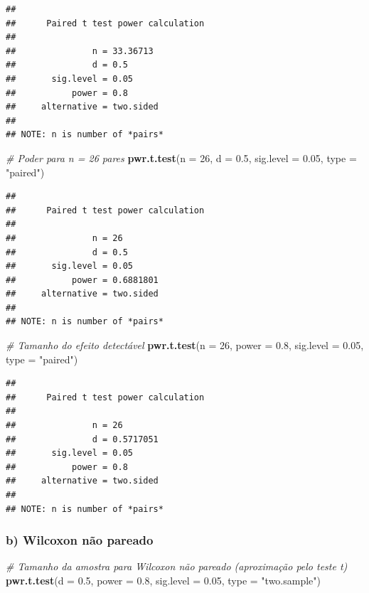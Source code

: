 \documentclass[
]{book}
\newenvironment{Shaded}{\begin{snugshade}}{\end{snugshade}}
\newcommand{\AttributeTok}[1]{\textcolor[rgb]{0.13,0.29,0.53}{#1}}
\newcommand{\CommentTok}[1]{\textcolor[rgb]{0.56,0.35,0.01}{\textit{#1}}}
\newcommand{\DecValTok}[1]{\textcolor[rgb]{0.00,0.00,0.81}{#1}}
\newcommand{\FloatTok}[1]{\textcolor[rgb]{0.00,0.00,0.81}{#1}}
\newcommand{\FunctionTok}[1]{\textcolor[rgb]{0.13,0.29,0.53}{\textbf{#1}}}
\newcommand{\NormalTok}[1]{#1}
\newcommand{\StringTok}[1]{\textcolor[rgb]{0.31,0.60,0.02}{#1}}
\begin{document}
\begin{verbatim}
## 
##      Paired t test power calculation 
## 
##               n = 33.36713
##               d = 0.5
##       sig.level = 0.05
##           power = 0.8
##     alternative = two.sided
## 
## NOTE: n is number of *pairs*
\end{verbatim}

\begin{Shaded}
\begin{Highlighting}[]
\CommentTok{\# Poder para n = 26 pares}
\FunctionTok{pwr.t.test}\NormalTok{(}\AttributeTok{n =} \DecValTok{26}\NormalTok{, }\AttributeTok{d =} \FloatTok{0.5}\NormalTok{, }\AttributeTok{sig.level =} \FloatTok{0.05}\NormalTok{, }\AttributeTok{type =} \StringTok{"paired"}\NormalTok{)}
\end{Highlighting}
\end{Shaded}

\begin{verbatim}
## 
##      Paired t test power calculation 
## 
##               n = 26
##               d = 0.5
##       sig.level = 0.05
##           power = 0.6881801
##     alternative = two.sided
## 
## NOTE: n is number of *pairs*
\end{verbatim}

\begin{Shaded}
\begin{Highlighting}[]
\CommentTok{\# Tamanho do efeito detectável}
\FunctionTok{pwr.t.test}\NormalTok{(}\AttributeTok{n =} \DecValTok{26}\NormalTok{, }\AttributeTok{power =} \FloatTok{0.8}\NormalTok{, }\AttributeTok{sig.level =} \FloatTok{0.05}\NormalTok{, }\AttributeTok{type =} \StringTok{"paired"}\NormalTok{)}
\end{Highlighting}
\end{Shaded}

\begin{verbatim}
## 
##      Paired t test power calculation 
## 
##               n = 26
##               d = 0.5717051
##       sig.level = 0.05
##           power = 0.8
##     alternative = two.sided
## 
## NOTE: n is number of *pairs*
\end{verbatim}

\subsubsection{b) Wilcoxon não pareado}\label{b-wilcoxon-nuxe3o-pareado}

\begin{Shaded}
\begin{Highlighting}[]
\CommentTok{\# Tamanho da amostra para Wilcoxon não pareado (aproximação pelo teste t)}
\FunctionTok{pwr.t.test}\NormalTok{(}\AttributeTok{d =} \FloatTok{0.5}\NormalTok{, }\AttributeTok{power =} \FloatTok{0.8}\NormalTok{, }\AttributeTok{sig.level =} \FloatTok{0.05}\NormalTok{, }\AttributeTok{type =} \StringTok{"two.sample"}\NormalTok{)}
\end{Highlighting}
\end{Shaded}
\end{document}
